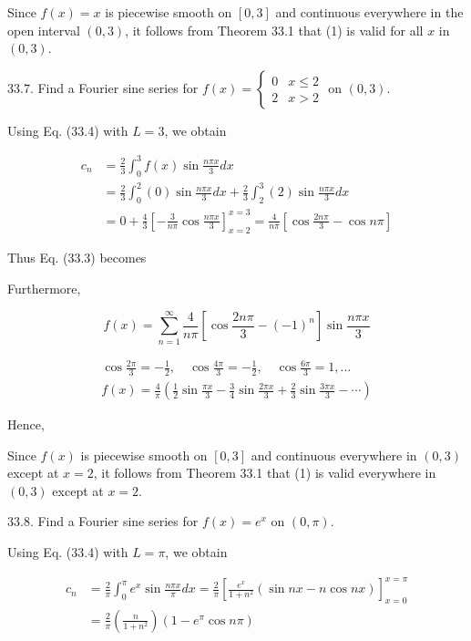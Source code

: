 \documentclass[10pt]{article}
\begin{document}
Since $f(x)=x$ is piecewise smooth on $[0,3]$ and continuous everywhere in the open interval $(0,3)$, it follows from Theorem 33.1 that (1) is valid for all $x$ in $(0,3)$.

33.7. Find a Fourier sine series for $f(x)=\left\{\begin{array}{ll}0 & x \leq 2 \\ 2 & x>2\end{array}\right.$ on $(0,3)$.

Using Eq. (33.4) with $L=3$, we obtain

$$
\begin{aligned}
c_{n} & =\frac{2}{3} \int_{0}^{3} f(x) \sin \frac{n \pi x}{3} d x \\
& =\frac{2}{3} \int_{0}^{2}(0) \sin \frac{n \pi x}{3} d x+\frac{2}{3} \int_{2}^{3}(2) \sin \frac{n \pi x}{3} d x \\
& =0+\frac{4}{3}\left[-\frac{3}{n \pi} \cos \frac{n \pi x}{3}\right]_{x=2}^{x=3}=\frac{4}{n \pi}\left[\cos \frac{2 n \pi}{3}-\cos n \pi\right]
\end{aligned}
$$

Thus Eq. (33.3) becomes

Furthermore,

$$
f(x)=\sum_{n=1}^{\infty} \frac{4}{n \pi}\left[\cos \frac{2 n \pi}{3}-(-1)^{n}\right] \sin \frac{n \pi x}{3}
$$


\begin{gather*}
\cos \frac{2 \pi}{3}=-\frac{1}{2}, \quad \cos \frac{4 \pi}{3}=-\frac{1}{2}, \quad \cos \frac{6 \pi}{3}=1, \ldots \\
f(x)=\frac{4}{\pi}\left(\frac{1}{2} \sin \frac{\pi x}{3}-\frac{3}{4} \sin \frac{2 \pi x}{3}+\frac{2}{3} \sin \frac{3 \pi x}{3}-\cdots\right) \tag{1}
\end{gather*}


Hence,

Since $f(x)$ is piecewise smooth on $[0,3]$ and continuous everywhere in $(0,3)$ except at $x=2$, it follows from Theorem 33.1 that (1) is valid everywhere in $(0,3)$ except at $x=2$.

33.8. Find a Fourier sine series for $f(x)=e^{x}$ on $(0, \pi)$.

Using Eq. (33.4) with $L=\pi$, we obtain

$$
\begin{aligned}
c_{n} & =\frac{2}{\pi} \int_{0}^{\pi} e^{x} \sin \frac{n \pi x}{\pi} d x=\frac{2}{\pi}\left[\frac{e^{x}}{1+n^{2}}(\sin n x-n \cos n x)\right]_{x=0}^{x=\pi} \\
& =\frac{2}{\pi}\left(\frac{n}{1+n^{2}}\right)\left(1-e^{\pi} \cos n \pi\right)
\end{aligned}
$$
\end{document}

